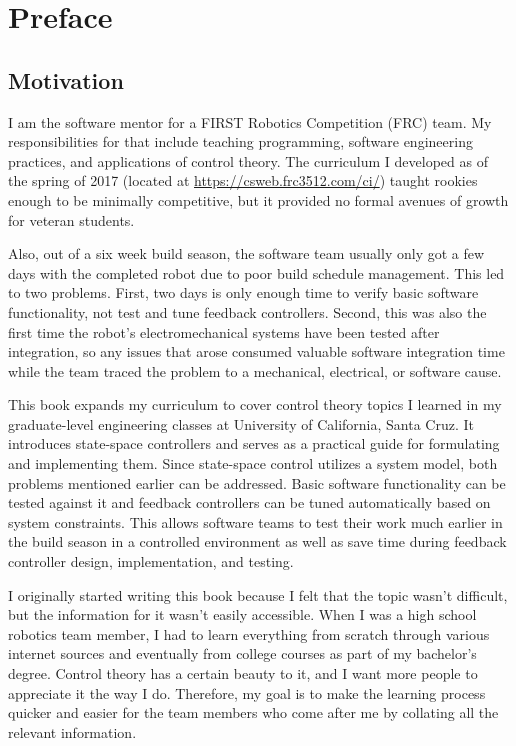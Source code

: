 
\chapter*{Preface}

\section*{Motivation}

I am the software mentor for a FIRST Robotics Competition (FRC) team. My
responsibilities for that include teaching programming, software engineering
practices, and applications of control theory. The curriculum I developed as of
the spring of 2017 (located at \url{https://csweb.frc3512.com/ci/}) taught
rookies enough to be minimally competitive, but it provided no formal avenues of
growth for veteran students.

Also, out of a six week build season, the software team usually only got a few
days with the completed robot due to poor build schedule management. This led to
two problems. First, two days is only enough time to verify basic software
functionality, not test and tune feedback controllers. Second, this was also the
first time the robot's electromechanical systems have been tested after
integration, so any issues that arose consumed valuable software integration
time while the team traced the problem to a mechanical, electrical, or software
cause.

This book expands my curriculum to cover control theory topics I learned in my
graduate-level engineering classes at University of California, Santa Cruz. It
introduces state-space controllers and serves as a practical guide for
formulating and implementing them. Since state-space control utilizes a system
model, both problems mentioned earlier can be addressed. Basic software
functionality can be tested against it and feedback controllers can be tuned
automatically based on system constraints. This allows software teams to test
their work much earlier in the build season in a controlled environment as well
as save time during feedback controller design, implementation, and testing.

I originally started writing this book because I felt that the topic wasn't
difficult, but the information for it wasn't easily accessible. When I was a
high school robotics team member, I had to learn everything from scratch through
various internet sources and eventually from college courses as part of my
bachelor's degree. Control theory has a certain beauty to it, and I want more
people to appreciate it the way I do. Therefore, my goal is to make the learning
process quicker and easier for the team members who come after me by collating
all the relevant information.


